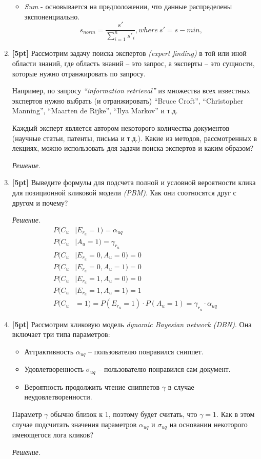 \begin{enumerate}
\begin{itemize}
		\item \textit{Sum} - основывается на предположении, что данные распределены экспоненциально.
		\begin{equation*}
			s_{norm} = \frac{s'}{\sum\limits_{i = 1}^{n}s'_i}, where \ s' = s - min, 
		\end{equation*}
	\end{itemize}
	
	
	\item \textbf{[5pt]} Рассмотрим задачу поиска экспертов \textit{(expert finding)} в той или 
	иной области знаний, где область знаний – это запрос, а эксперты – это сущности, которые нужно 
	отранжировать по запросу.
		
	Например, по запросу \textit{``information retrieval''} из множества всех известных 
	экспертов	нужно выбрать (и отранжировать) ``Bruce Croft'', ``Christopher Manning'', 
	``Maarten de Rijke'', ``Ilya Markov'' и т.д.
	
	Каждый эксперт является автором некоторого количества документов (научные статьи, патенты, 
	письма и т.д.). Какие из методов, рассмотренных в лекциях, можно использовать для задачи 
	поиска экспертов и каким образом?
	
	\textit{Решение.}
	\item \textbf{[5pt]} Выведите формулы для подсчета полной и условной вероятности клика для	
	позиционной кликовой модели \textit{(PBM)}. Как они соотносятся друг с другом и почему?
	
	\textit{Решение.}
	\begin{align*}
		P(C_u &|E_{r_u} = 1 ) = \alpha_{uq}\\
		P(C_u &|A_u = 1) = \gamma_{r_u}\\
		P(C_u &|E_{r_u} = 0 , A_u = 0) = 0\\
		P(C_u &|E_{r_u} = 0 , A_u = 1) = 0\\
		P(C_u &|E_{r_u} = 1 , A_u = 0) = 0\\
		P(C_u &|E_{r_u} = 1 , A_u = 1) = 1 \\
		P(C_u &= 1) = P(E_{r_u} = 1) \cdot P(A_u = 1) = \gamma_{r_u} \cdot \alpha_{uq}
	\end{align*}
	
	\item \textbf{[5pt]} Рассмотрим кликовую модель \textit{dynamic Bayesian network (DBN)}. Она 
	включает три типа параметров:
	
	\begin{itemize}
		\item Аттрактивность $\alpha_{uq}$ – пользователю понравился сниппет.
		\item Удовлетворенность $\sigma_{uq}$ – пользователю понравился сам документ.
		\item Вероятность продолжить чтение сниппетов $\gamma$ в случае неудовлетворенности.
	\end{itemize}
	
	Параметр $\gamma$ обычно близок к 1, поэтому будет считать, что $\gamma = 1$. Как в этом 
	случае подсчитать значения параметров $\alpha_{uq}$ и $\sigma_{uq}$ на основании некоторого 
	имеющегося лога кликов?
	
	\textit{Решение.}
\end{enumerate}
